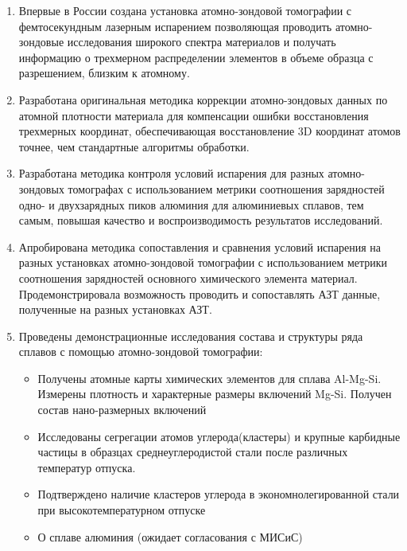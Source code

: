 \begin{enumerate}[beginpenalty=10000]
	\item Впервые в России создана установка атомно-зондовой томографии с фемтосекундным лазерным испарением позволяющая проводить атомно-зондовые исследования широкого спектра материалов  и получать информацию о трехмерном распределении элементов в объеме образца с разрешением, близким к атомному.
	\item Разработана оригинальная методика коррекции атомно-зондовых данных по атомной плотности материала для компенсации ошибки восстановления трехмерных координат, обеспечивающая восстановление 3D координат атомов точнее, чем стандартные алгоритмы обработки.     
	\item Разработана методика контроля условий испарения для разных атомно-зондовых томографах с использованием метрики соотношения зарядностей одно- и двухзарядных пиков алюминия для алюминиевых сплавов, тем самым, повышая качество и воспроизводимость результатов исследований.
	\item Апробирована методика сопоставления и сравнения условий испарения на разных установках атомно-зондовой томографии с использованием метрики соотношения зарядностей основного химического элемента материал. Продемонстрировала возможность проводить и сопоставлять АЗТ данные, полученные на разных установках АЗТ.
	\item Проведены демонстрационные исследования состава и структуры ряда сплавов с помощью атомно-зондовой томографии:
	\begin{itemize}
		\item Получены атомные карты химических элементов для сплава Al-Mg-Si. Измерены плотность и характерные размеры включений Mg-Si. Получен состав нано-размерных включений
		\item Исследованы сегрегации атомов углерода(кластеры) и крупные карбидные частицы в образцах среднеуглеродистой стали после различных температур отпуска.
		\item Подтверждено наличие кластеров углерода в экономнолегированной стали при высокотемпературном отпуске
		\item О сплаве алюминия (ожидает согласования с МИСиС)
	\end{itemize}
\end{enumerate}

